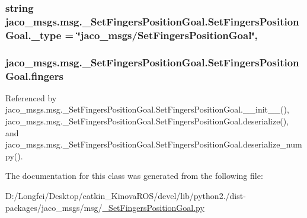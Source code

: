 \subsubsection[{\texorpdfstring{\+\_\+type}{_type}}]{\setlength{\rightskip}{0pt plus 5cm}string jaco\+\_\+msgs.\+msg.\+\_\+\+Set\+Fingers\+Position\+Goal.\+Set\+Fingers\+Position\+Goal.\+\_\+type = \char`\"{}jaco\+\_\+msgs/{\bf Set\+Fingers\+Position\+Goal}\char`\"{}\hspace{0.3cm}{\ttfamily [static]}, {\ttfamily [private]}}\hypertarget{classjaco__msgs_1_1msg_1_1__SetFingersPositionGoal_1_1SetFingersPositionGoal_af65c7bdf9a8116c1b309bd0d844c9b90}{}\label{classjaco__msgs_1_1msg_1_1__SetFingersPositionGoal_1_1SetFingersPositionGoal_af65c7bdf9a8116c1b309bd0d844c9b90}
\subsubsection[{\texorpdfstring{fingers}{fingers}}]{\setlength{\rightskip}{0pt plus 5cm}jaco\+\_\+msgs.\+msg.\+\_\+\+Set\+Fingers\+Position\+Goal.\+Set\+Fingers\+Position\+Goal.\+fingers}\hypertarget{classjaco__msgs_1_1msg_1_1__SetFingersPositionGoal_1_1SetFingersPositionGoal_ab7578aa64d5376794159263ab55d0543}{}\label{classjaco__msgs_1_1msg_1_1__SetFingersPositionGoal_1_1SetFingersPositionGoal_ab7578aa64d5376794159263ab55d0543}


Referenced by jaco\+\_\+msgs.\+msg.\+\_\+\+Set\+Fingers\+Position\+Goal.\+Set\+Fingers\+Position\+Goal.\+\_\+\+\_\+init\+\_\+\+\_\+(), jaco\+\_\+msgs.\+msg.\+\_\+\+Set\+Fingers\+Position\+Goal.\+Set\+Fingers\+Position\+Goal.\+deserialize(), and jaco\+\_\+msgs.\+msg.\+\_\+\+Set\+Fingers\+Position\+Goal.\+Set\+Fingers\+Position\+Goal.\+deserialize\+\_\+numpy().



The documentation for this class was generated from the following file\+:\begin{DoxyCompactItemize}
\item 
D\+:/\+Longfei/\+Desktop/catkin\+\_\+\+Kinova\+R\+O\+S/devel/lib/python2./dist-\/packages/jaco\+\_\+msgs/msg/\hyperlink{__SetFingersPositionGoal_8py}{\+\_\+\+Set\+Fingers\+Position\+Goal.\+py}\end{DoxyCompactItemize}
